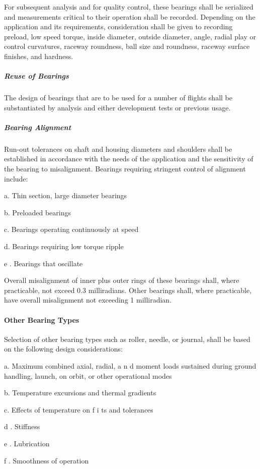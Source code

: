 \documentclass[12pt]{article}
\begin{document}
For subsequent analysis and for quality control, these bearings shall be serialized and measurements critical to their operation shall be recorded. 
Depending on the application and its requirements, consideration shall be given to recording preload, low speed torque, inside diameter, outside diameter, angle, radial play or control curvatures, raceway roundness, ball size and roundness, raceway surface finishes, and hardness.

\subparagraph{Reuse of Bearings} %
The design of bearings that are to be used for a number of flights shall be substantiated by analysis and either development tests or previous usage.

\subparagraph{Bearing Alignment} %
Run-out tolerances on shaft and housing diameters and shoulders shall be established in accordance with the needs of the application and the sensitivity of the bearing to misalignment. 
Bearings requiring stringent control of alignment include:

a. Thin section, large diameter bearings

b. Preloaded bearings

c. Bearings operating continuously at speed

d. Bearings requiring low torque ripple

e . Bearings that oscillate

Overall misalignment of inner plus outer rings of these bearings shall, where practicable, not exceed 0.3 milliradians.
Other bearings shall, where practicable, have overall misalignment not exceeding 1 milliradian.

\paragraph{Other Bearing Types} %
Selection of other bearing types such as roller, needle, or journal, shall be based on the following design considerations:

a. Maximum combined axial, radial, a n d moment loads sustained during ground handling, launch, on orbit, or other operational modes

b. Temperature excursions and thermal gradients

c. Effects of temperature on f i ts and tolerances

d . Stiffness

e . Lubrication

f . Smoothness of operation
\end{document}
